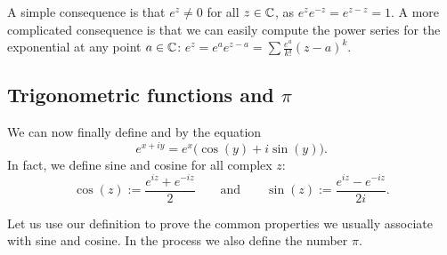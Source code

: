 A simple consequence is that $e^z\not=0$ for all $z \in {\mathbb{C}}$,
as $e^z e^{-z} = e^{z-z} = 1$.  A more complicated consequence is that we
can easily compute the power series for the exponential at any point $a \in
{\mathbb{C}}$:
$e^z = e^a e^{z-a} = \sum \frac{e^a}{k!} {(z-a)}^k$.

\subsection{Trigonometric functions and $\pi$}

We can now finally define \emph{} and \emph{}
by the equation
\begin{equation*}
e^{x+iy} = e^x \bigl( \cos(y) + i \sin(y) \bigr) .
\end{equation*}
In fact, we define sine and cosine for all complex $z$:
\begin{equation*}
\cos(z) := \frac{e^{iz} + e^{-iz}}{2}
\qquad\text{and}\qquad
\sin(z) := \frac{e^{iz} - e^{-iz}}{2i} .
\end{equation*}

Let us use our definition to prove the common properties we usually
associate with sine and cosine.  In the process we also define the
number $\pi$.

